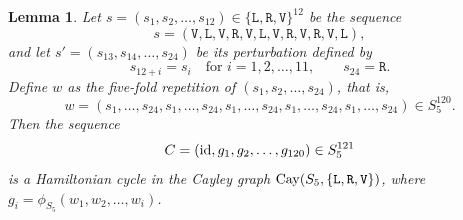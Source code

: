 \documentclass[lualatex,11pt]{article}
\newtheorem{lem}{Lemma}
\begin{document}
\begin{lem}
 \label{lem:hamS5}
Let \( s = (s_1, s_2, \ldots, s_{12}) \in \{\mathtt{L}, \mathtt{R}, \mathtt{V}\}^{12} \) be the sequence
\begin{equation}
\label{eq:s}
s = (\mathtt{V}, \mathtt{L}, \mathtt{V}, \mathtt{R}, 
\mathtt{V}, \mathtt{L}, \mathtt{V}, \mathtt{R}, \mathtt{V}, \mathtt{R}, \mathtt{V}, \mathtt{L}), 
\end{equation}
and let \( s' = (s_{13}, s_{14}, \ldots, s_{24}) \) be its perturbation defined by
\begin{equation}
 \label{eq:s'}
s_{12+i} = s_i \quad \mbox{for } i = 1, 2, \ldots, 11, \qquad s_{24} = \mathtt{R}.
\end{equation}
 Define $w$ as the five-fold repetition of $(s_1,s_2,\ldots, s_{24})$,
 that is,
 \begin{equation}
  \label{eq:w}
 w  = (s_1,\ldots, s_{24}, s_1, \ldots, s_{24}, s_1, \ldots, s_{24},
 s_1, \ldots, s_{24}, s_1, \ldots, s_{24}
 )
 \in S_5^{120}.
 \end{equation}
 Then the sequence 
 \[
  C = ({\rm id}, g_1, g_2, \ldots, g_{120}) \in S_5^{121}
 \]
 is a Hamiltonian cycle in the
 Cayley graph ${\rm Cay}(S_5,\{{\mathtt L}, {\mathtt R}, {\mathtt V}\})$, where
 $g_i=\phi_{S_5}(w_1,w_2,\ldots, w_i)$.
\end{lem}
\end{document}

